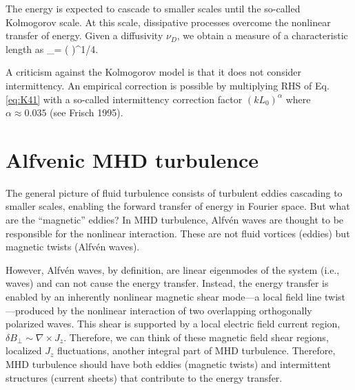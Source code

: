 \documentclass[usenatbib,twocolumn, twocolappendix]{aastex63}
\begin{document}
The energy is expected to cascade to smaller scales until the so-called Kolmogorov scale.
At this scale, dissipative processes overcome the nonlinear transfer of energy.
Given a diffusivity $\nu_D$, we obtain a measure of a characteristic length as
\be
\ell_\nu = \left(  \right)^{1/4}.
\ee

A criticism against the Kolmogorov model is that it does not consider intermittency.
An empirical correction is possible by multiplying RHS of Eq. \eqref{eq:K41} with a so-called intermittency correction factor $(k L_0)^\alpha$ where $\alpha \approx 0.035$ (see Frisch 1995).


\section{Alfvenic MHD turbulence}\label{sect:mhd_theory}


The general picture of fluid turbulence consists of turbulent eddies cascading to smaller scales, enabling the forward transfer of energy in Fourier space. 
But what are the ``magnetic'' eddies?
In MHD turbulence, Alfv\'en waves are thought to be responsible for the nonlinear interaction.
These are not fluid vortices (eddies) but magnetic twists (Alfv\'en waves).

However, Alfv\'en waves, by definition, are linear eigenmodes of the system (i.e., waves) and can not cause the energy transfer.
Instead, the energy transfer is enabled by an inherently nonlinear magnetic shear mode---a local field line twist---produced by the nonlinear interaction of two overlapping orthogonally polarized waves.
This shear is supported by a local electric field current region, $\delta B_\perp \sim \nabla \times J_z$.
Therefore, we can think of these magnetic field shear regions, localized $J_z$ fluctuations, another integral part of MHD turbulence.
Therefore, MHD turbulence should have both eddies (magnetic twists) and intermittent structures (current sheets) that contribute to the energy transfer.
\end{document}
